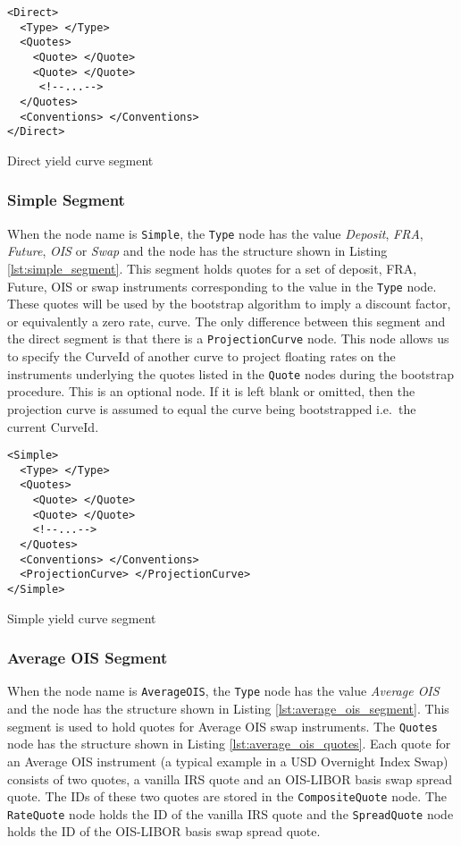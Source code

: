 \begin{listing}[H]
\begin{verbatim}
<Direct>
  <Type> </Type>
  <Quotes>
    <Quote> </Quote>
    <Quote> </Quote>
     <!--...-->
  </Quotes>
  <Conventions> </Conventions>
</Direct>
\end{verbatim}
\caption{Direct yield curve segment}
\label{lst:direct_segment}
\end{listing}


\subsubsection*{Simple Segment}
When the node name is \lstinline!Simple!, the \lstinline!Type! node has the value \emph{Deposit}, \emph{FRA}, 
\emph{Future}, \emph{OIS} or \emph{Swap} and the node has the structure shown in Listing \ref{lst:simple_segment}. This 
segment holds quotes for a set of deposit, FRA, Future, OIS or swap instruments corresponding to the value in the 
\lstinline!Type! node. These quotes will be used by the bootstrap algorithm to imply a discount factor, or equivalently a 
zero rate, curve. The only difference between this segment and the direct segment is that there is a 
\lstinline!ProjectionCurve! node. This node allows us to specify the CurveId of another curve to project floating rates on 
the instruments underlying the quotes listed in the \lstinline!Quote! nodes during the bootstrap procedure. This is an 
optional node. If it is left blank or omitted, then the projection curve is assumed to equal the curve being bootstrapped 
i.e.\ the current CurveId.

\begin{listing}[H]
\begin{verbatim}
<Simple>
  <Type> </Type>
  <Quotes>
    <Quote> </Quote>
    <Quote> </Quote>
    <!--...-->
  </Quotes>
  <Conventions> </Conventions>
  <ProjectionCurve> </ProjectionCurve>
</Simple>
\end{verbatim}
\caption{Simple yield curve segment}
\label{lst:simple_segment}
\end{listing}

\subsubsection*{Average OIS Segment}
When the node name is \lstinline!AverageOIS!, the \lstinline!Type! node has the value \emph{Average OIS} and the node has 
the structure shown in Listing \ref{lst:average_ois_segment}. This segment is used to hold quotes for Average OIS swap 
instruments. The \lstinline!Quotes! node has the structure shown in Listing \ref{lst:average_ois_quotes}. Each quote for 
an Average OIS instrument (a typical example in a USD Overnight Index
Swap) consists of two quotes, a vanilla IRS quote and an OIS-LIBOR
basis swap spread quote.  The IDs of 
these two quotes are stored in the \lstinline!CompositeQuote! node. The \lstinline!RateQuote! node holds the ID of the  
vanilla IRS quote and the \lstinline!SpreadQuote! node holds the ID of the OIS-LIBOR basis swap spread quote.

